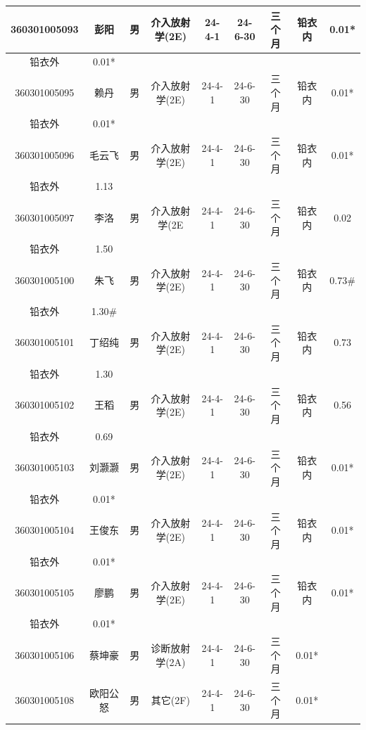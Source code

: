 \begin{table}[H]
\centering
\begin{tabular}{|c|c|c|c|c|c|c|c|c|}
\hline
360301005093 & 彭阳 & 男 & 介入放射学(2E) & 24-4-1 & 24-6-30 & 三个月 & 铅衣内 & 0.01* \\
\hline
铅衣外 & 0.01* &  &  &  &  &  &  &  \\
\hline
360301005095 & 赖丹 & 男 & 介入放射学(2E) & 24-4-1 & 24-6-30 & 三个月 & 铅衣内 & 0.01* \\
\hline
铅衣外 & 0.01* &  &  &  &  &  &  &  \\
\hline
360301005096 & 毛云飞 & 男 & 介入放射学(2E) & 24-4-1 & 24-6-30 & 三个月 & 铅衣内 & 0.01* \\
\hline
铅衣外 & 1.13 &  &  &  &  &  &  &  \\
\hline
360301005097 & 李洛 & 男 & 介入放射学(2E & 24-4-1 & 24-6-30 & 三个月 & 铅衣内 & 0.02 \\
\hline
铅衣外 & 1.50 &  &  &  &  &  &  &  \\
\hline
360301005100 & 朱飞 & 男 & 介入放射学(2E) & 24-4-1 & 24-6-30 & 三个月 & 铅衣内 & 0.73\# \\
\hline
铅衣外 & 1.30\# &  &  &  &  &  &  &  \\
\hline
360301005101 & 丁绍纯 & 男 & 介入放射学(2E) & 24-4-1 & 24-6-30 & 三个月 & 铅衣内 & 0.73 \\
\hline
铅衣外 & 1.30 &  &  &  &  &  &  &  \\
\hline
360301005102 & 王稻 & 男 & 介入放射学(2E) & 24-4-1 & 24-6-30 & 三个月 & 铅衣内 & 0.56 \\
\hline
铅衣外 & 0.69 &  &  &  &  &  &  &  \\
\hline
360301005103 & 刘灏灏 & 男 & 介入放射学(2E) & 24-4-1 & 24-6-30 & 三个月 & 铅衣内 & 0.01* \\
\hline
铅衣外 & 0.01* &  &  &  &  &  &  &  \\
\hline
360301005104 & 王俊东 & 男 & 介入放射学(2E) & 24-4-1 & 24-6-30 & 三个月 & 铅衣内 & 0.01* \\
\hline
铅衣外 & 0.01* &  &  &  &  &  &  &  \\
\hline
360301005105 & 廖鹏 & 男 & 介入放射学(2E) & 24-4-1 & 24-6-30 & 三个月 & 铅衣内 & 0.01* \\
\hline
铅衣外 & 0.01* &  &  &  &  &  &  &  \\
\hline
360301005106 & 蔡坤豪 & 男 & 诊断放射学(2A) & 24-4-1 & 24-6-30 & 三个月 & 0.01* &  \\
\hline
360301005108 & 欧阳公怒 & 男 & 其它(2F) & 24-4-1 & 24-6-30 & 三个月 & 0.01* &  \\

\end{tabular}
\end{table}

